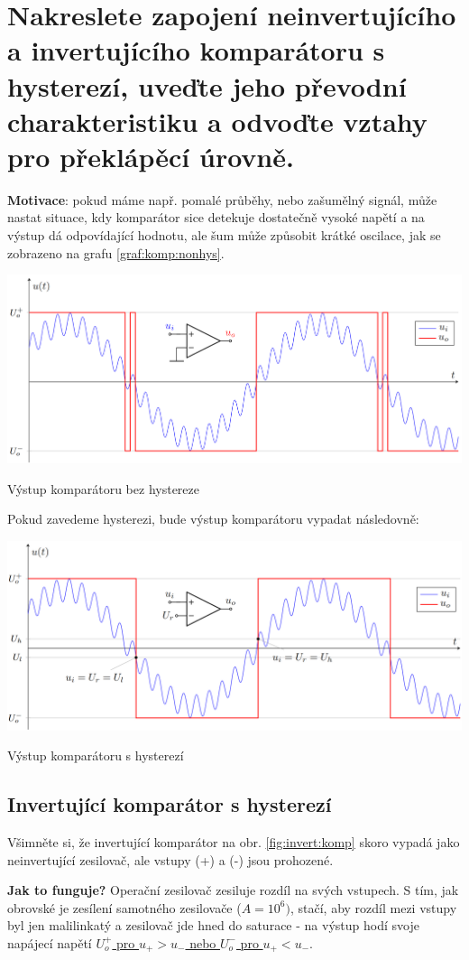 \documentclass[a4paper,12pt]{article}   %
\begin{document}
\section{Nakreslete zapojení neinvertujícího a invertujícího komparátoru s hysterezí, uveďte jeho převodní charakteristiku a odvoďte vztahy pro překlápěcí úrovně.}
\label{chap:komp}
\textbf{Motivace}: pokud máme např. pomalé průběhy, nebo zašumělný signál, může nastat situace, kdy komparátor sice detekuje dostatečně vysoké napětí a na výstup dá odpovídající hodnotu, ale šum může způsobit krátké oscilace, jak se zobrazeno na grafu \ref{graf:komp:nonhys}.
\begin{graf}
    \centering
    \includegraphics[width=.7\textwidth]{komparator-nehyst-graf.PNG}
    \caption{Výstup komparátoru bez hystereze}
    \label{graf:komp:nonhys}
\end{graf}

Pokud zavedeme hysterezi, bude výstup komparátoru vypadat následovně:
\begin{graf}
    \centering
    \includegraphics[width=.7\textwidth]{komparator-hyst-graf.PNG}
    \caption{Výstup komparátoru s hysterezí}
    \label{graf:komp:hyst}
\end{graf}

\subsection*{Invertující komparátor s hysterezí}
Všimněte si, že invertující komparátor na obr. \ref{fig:invert:komp} skoro vypadá jako neinvertující zesilovač, ale vstupy (+) a (-) jsou prohozené.

\textbf{Jak to funguje?} Operační zesilovač zesiluje rozdíl na svých vstupech. S tím, jak obrovské je zesílení samotného zesilovače ($A = 10^6)$, stačí, aby rozdíl mezi vstupy byl jen malilinkatý a zesilovač jde hned do saturace - na výstup hodí svoje napájecí napětí \underline{$U_o^+$ pro $u_+ > u_-$ nebo $U_o^-$ pro $u_+ < u_-$}.
\end{document}
